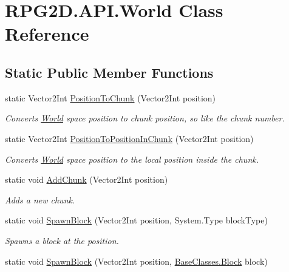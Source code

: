 \hypertarget{class_r_p_g2_d_1_1_a_p_i_1_1_world}{}\section{R\+P\+G2\+D.\+A\+P\+I.\+World Class Reference}
\label{class_r_p_g2_d_1_1_a_p_i_1_1_world}
\subsection*{Static Public Member Functions}
\begin{DoxyCompactItemize}
\item 
static Vector2\+Int \mbox{\hyperlink{class_r_p_g2_d_1_1_a_p_i_1_1_world_ae8afbfcfaaecd14e30cf343404c4336d}{Position\+To\+Chunk}} (Vector2\+Int position)
\begin{DoxyCompactList}\small\item\em Converts \mbox{\hyperlink{class_r_p_g2_d_1_1_a_p_i_1_1_world}{World}} space position to chunk position, so like the chunk number. \end{DoxyCompactList}\item 
static Vector2\+Int \mbox{\hyperlink{class_r_p_g2_d_1_1_a_p_i_1_1_world_a46adadcf2bd6165b14a803f7494c1219}{Position\+To\+Position\+In\+Chunk}} (Vector2\+Int position)
\begin{DoxyCompactList}\small\item\em Converts \mbox{\hyperlink{class_r_p_g2_d_1_1_a_p_i_1_1_world}{World}} space position to the local position inside the chunk. \end{DoxyCompactList}\item 
static void \mbox{\hyperlink{class_r_p_g2_d_1_1_a_p_i_1_1_world_a487e129cc74d77b2e003d197bb50a2a8}{Add\+Chunk}} (Vector2\+Int position)
\begin{DoxyCompactList}\small\item\em Adds a new chunk. \end{DoxyCompactList}\item 
static void \mbox{\hyperlink{class_r_p_g2_d_1_1_a_p_i_1_1_world_a3244e543b87453f50bb93a9d869caa83}{Spawn\+Block}} (Vector2\+Int position, System.\+Type block\+Type)
\begin{DoxyCompactList}\small\item\em Spawns a block at the position. \end{DoxyCompactList}\item 
static void \mbox{\hyperlink{class_r_p_g2_d_1_1_a_p_i_1_1_world_a36e060049f16cc356f30afded645521c}{Spawn\+Block}} (Vector2\+Int position, \mbox{\hyperlink{class_r_p_g2_d_1_1_base_classes_1_1_block}{Base\+Classes.\+Block}} block)

\end{DoxyCompactItemize}
